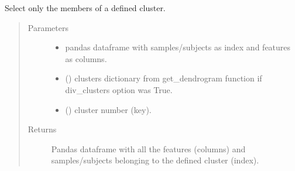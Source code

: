 \documentclass[letterpaper,10pt,english]{sphinxmanual}
\begin{document}

\begin{fulllineitems}
\label{\detokenize{_autosummary/analytics_core.analytics:analytics_core.analytics.wgcnaAnalysis.filter_df_by_cluster}}
Select only the members of a defined cluster.
\begin{quote}\begin{description}
\item[{Parameters}] \leavevmode\begin{itemize}
\item {} 
 \textendash{} pandas dataframe with samples/subjects as index and features as columns.

\item {} 
 () \textendash{} clusters dictionary from get\_dendrogram function if div\_clusters option was True.

\item {} 
 () \textendash{} cluster number (key).

\end{itemize}

\item[{Returns}] \leavevmode
Pandas dataframe with all the features (columns) and samples/subjects belonging to the defined cluster (index).

\end{description}\end{quote}

\end{fulllineitems}

\end{document}
